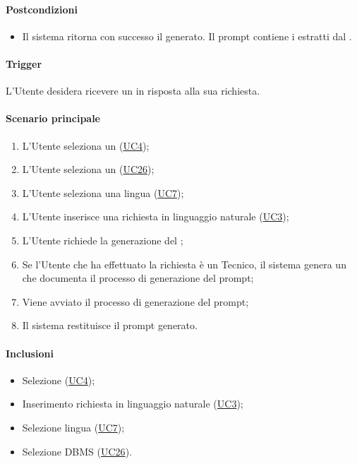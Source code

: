 \paragraph*{Postcondizioni}
\begin{itemize}
  \item Il sistema ritorna con successo il  generato. Il prompt contiene i  estratti dal .
\end{itemize}

\paragraph*{Trigger}
L'Utente desidera ricevere un  in risposta alla sua richiesta.

\paragraph*{Scenario principale}
\begin{enumerate}
  \item L'Utente seleziona un (\hyperref[UC4]{UC4});
  \item L'Utente seleziona un  (\hyperref[UC26]{UC26});
  \item L'Utente seleziona una lingua (\hyperref[UC7]{UC7});
  \item L'Utente inserisce una richiesta in linguaggio naturale (\hyperref[UC3]{UC3});
  \item L'Utente richiede la generazione del ;
  \item Se l'Utente che ha effettuato la richiesta è un Tecnico, il sistema genera un  che documenta il processo di generazione del prompt;
  \item Viene avviato il processo di generazione del prompt;
  \item Il sistema restituisce il prompt generato.
\end{enumerate}

\paragraph*{Inclusioni}
\begin{itemize}
  \item Selezione  (\hyperref[UC4]{UC4});
  \item Inserimento richiesta in linguaggio naturale (\hyperref[UC3]{UC3});
  \item Selezione lingua (\hyperref[UC7]{UC7});
  \item Selezione DBMS (\hyperref[UC26]{UC26}).
\end{itemize}

